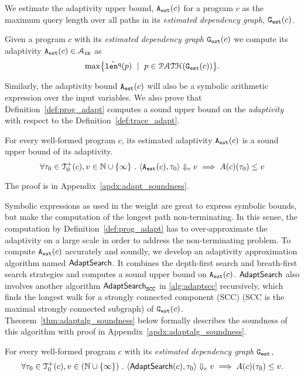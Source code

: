  We estimate the adaptivity upper bound, ${\mathtt{A_{est}}}(c)$ for a program $c$ as the maximum query length over all paths in its \emph{estimated dependency graph}, $\mathtt{{G_{est}}}({c})$. 
\begin{defn}
\label{def:prog_adapt}
{
Given a program ${c}$ with its \emph{estimated dependency graph} 
$\mathtt{{G_{est}}}({c})$ we compute its adaptivity ${\mathtt{A_{est}}}({c}) \in \mathcal{A}_{\mathtt{in}}$ as
%
\[
 \max \left\{ \hat{\qlen}(p) \ \mid \  p \in \paths(\progG(c))\right \}.
\]
}
\end{defn}
Similarly, the adaptivity bound ${\mathtt{A_{est}}}(c)$ will also be a symbolic arithmetic expression over the input variables. 
We also prove that Definition~\ref{def:prog_adapt} computes
a sound upper bound on the \emph{adaptivity} with respect to the Definition~\ref{def:trace_adapt}.
\begin{thm}
 \label{thm:adaptfun_sound}
 For every well-formed program $c$, 
 its estimated adaptivity ${\mathtt{A_{est}}}({c})$ is a sound upper bound of its adaptivity.
 \[
 \forall \mathtt{\tau}_0 \in \mathcal{T}^{+}_{0}(c), v \in \mathbb{N} \cup \{\infty\} ~.~
 \langle {\ensuremath{\mathtt{A_{est}}}}(c), \mathtt{\tau}_0 \rangle \Downarrow_e v \implies A(c)(\mathtt{\tau}_0) \leq v
\] 
\end{thm}
The proof is in Appendix~\ref{apdx:adapt_soundness}.


Symbolic expressions as used in the weight are great to express symbolic bounds, but make the computation of 
the longest path non-terminating. 
In this sense, the computation by Definition~\ref{def:prog_adapt} has to
over-approximate the adaptivity on a large scale in order to address the non-terminating problem.
To compute ${\mathtt{A_{est}}}(c)$ accurately and soundly, we develop an adaptivity approximation algorithm named $\mathsf{AdaptSearch}$.
It combines the depth-first search and breath-first search strategies and computes a sound upper bound on ${\mathtt{A_{est}}}(c)$.
$\mathsf{AdaptSearch}$ also involves another algorithm $\mathsf{AdaptSearch}_{\mathtt{SCC}}$ in \ref{alg:adaptscc} recursively, which finds the longest walk for a strongly connected component (SCC) (SCC is the maximal strongly connected subgraph) of $\mathtt{{G_{est}}}(c)$.
Theorem~\ref{thm:adaptalg_soundness} below formally describes the soundness of this algorithm with proof in Appendix~\ref{apdx:adaptalg_soundness}.
\begin{thm}
 \label{thm:adaptalg_soundness}
 For every well-formed program $c$ with its \emph{estimated dependency graph} $\mathtt{{G_{est}}}$,
 \[ 
 \forall \mathtt{\tau}_0 \in \mathcal{T}^{+}_{0}(c), v \in (\mathbb{N}\cup \{\infty\}) ~.~
 \langle \mathsf{AdaptSearch}(c), \mathtt{\tau}_0 \rangle \Downarrow_e v \implies A(c)(\mathtt{\tau}_0) \leq v.
 \]
\end{thm}

